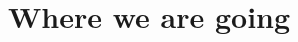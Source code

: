 \documentclass[presentation]{beamer}\mode<presentation>{\usetheme{blackAMSBolognaFC}}
\begin{document}

\section{Where we are going}

\end{document}
